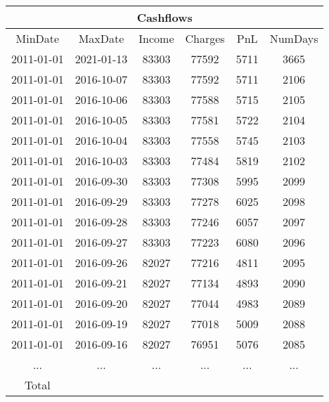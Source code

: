 \begin{longtable}{|c|c|c|c|c|c|}
\hline
\multicolumn{6}{|c|}{Cashflows} \\
\hline
MinDate & MaxDate & Income & Charges & PnL & NumDays\\
\hline
2011-01-01 & 2021-01-13 & 83303 & 77592 & 5711 & 3665\\
\hline
2011-01-01 & 2016-10-07 & 83303 & 77592 & 5711 & 2106\\
\hline
2011-01-01 & 2016-10-06 & 83303 & 77588 & 5715 & 2105\\
\hline
2011-01-01 & 2016-10-05 & 83303 & 77581 & 5722 & 2104\\
\hline
2011-01-01 & 2016-10-04 & 83303 & 77558 & 5745 & 2103\\
\hline
2011-01-01 & 2016-10-03 & 83303 & 77484 & 5819 & 2102\\
\hline
2011-01-01 & 2016-09-30 & 83303 & 77308 & 5995 & 2099\\
\hline
2011-01-01 & 2016-09-29 & 83303 & 77278 & 6025 & 2098\\
\hline
2011-01-01 & 2016-09-28 & 83303 & 77246 & 6057 & 2097\\
\hline
2011-01-01 & 2016-09-27 & 83303 & 77223 & 6080 & 2096\\
\hline
2011-01-01 & 2016-09-26 & 82027 & 77216 & 4811 & 2095\\
\hline
2011-01-01 & 2016-09-21 & 82027 & 77134 & 4893 & 2090\\
\hline
2011-01-01 & 2016-09-20 & 82027 & 77044 & 4983 & 2089\\
\hline
2011-01-01 & 2016-09-19 & 82027 & 77018 & 5009 & 2088\\
\hline
2011-01-01 & 2016-09-16 & 82027 & 76951 & 5076 & 2085\\
\hline
 ... & ... & ... & ... & ... & ...\\
\hline
 Total &  &  &  &  & \\
\hline
\end{longtable}
